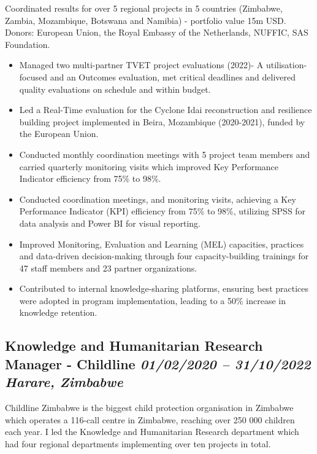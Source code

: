 \documentclass[
  10pt,
]{article}
\providecommand{\tightlist}{%
  \setlength{\itemsep}{0pt}\setlength{\parskip}{0pt}}
\begin{document}
Coordinated results for over 5 regional projects in 5 countries (Zimbabwe, Zambia, Mozambique, Botswana and Namibia) - portfolio value 15m USD. Donors: European Union, the Royal Embassy of the Netherlands, NUFFIC, SAS Foundation.

\begin{itemize}
\tightlist
\item
Managed two multi-partner TVET project evaluations (2022)- A utilisation-focused and an Outcomes evaluation, met critical deadlines and delivered quality evaluations on schedule and within budget.
\item
Led a Real-Time evaluation for the Cyclone Idai reconstruction and resilience building project implemented in Beira, Mozambique (2020-2021), funded by the European Union.
\item
Conducted monthly coordination meetings with 5 project team members and carried quarterly monitoring visits which improved Key Performance Indicator efficiency from 75\% to 98\%.
\item
Conducted coordination meetings, and monitoring visits, achieving a Key Performance Indicator (KPI) efficiency from 75\% to 98\%, utilizing SPSS for data analysis and Power BI for visual reporting.
\item
Improved Monitoring, Evaluation and Learning (MEL) capacities, practices and data-driven decision-making through four capacity-building trainings for 47 staff members and 23 partner organizations.
\item
Contributed to internal knowledge-sharing platforms, ensuring best practices were adopted in program implementation, leading to a 50\% increase in knowledge retention.
\end{itemize}

\subsection{\texorpdfstring{Knowledge and Humanitarian Research Manager - Childline \emph{01/02/2020 -- 31/10/2022} \textbar{} \emph{Harare, Zimbabwe}}{Knowledge and Humanitarian Research Manager - Childline 01/02/2020 -- 31/10/2022 \textbar{} Harare, Zimbabwe}}\label{knowledge-and-humanitarian-research-manager---childline-01022020-31102022-harare-zimbabwe}

Childline Zimbabwe is the biggest child protection organisation in Zimbabwe which operates a 116-call centre in Zimbabwe, reaching over 250 000 children each year. I led the Knowledge and Humanitarian Research department which had four regional departments implementing over ten projects in total.
\end{document}

